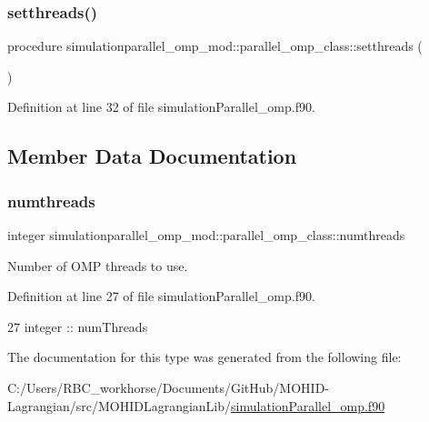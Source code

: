 \subsubsection{\texorpdfstring{setthreads()}{setthreads()}}
{\footnotesize\ttfamily procedure simulationparallel\+\_\+omp\+\_\+mod\+::parallel\+\_\+omp\+\_\+class\+::setthreads (\begin{DoxyParamCaption}{ }\end{DoxyParamCaption})\hspace{0.3cm}{\ttfamily [private]}}



Definition at line 32 of file simulation\+Parallel\+\_\+omp.\+f90.



\subsection{Member Data Documentation}
\mbox{\label{structsimulationparallel__omp__mod_1_1parallel__omp__class_ae0b69bf0f8a4f8df97fccf569ba20ff9}} 
\subsubsection{\texorpdfstring{numthreads}{numthreads}}
{\footnotesize\ttfamily integer simulationparallel\+\_\+omp\+\_\+mod\+::parallel\+\_\+omp\+\_\+class\+::numthreads\hspace{0.3cm}{\ttfamily [private]}}



Number of O\+MP threads to use. 



Definition at line 27 of file simulation\+Parallel\+\_\+omp.\+f90.


\begin{DoxyCode}
27         \textcolor{keywordtype}{integer} :: numThreads
\end{DoxyCode}


The documentation for this type was generated from the following file\+:\begin{DoxyCompactItemize}
\item 
C\+:/\+Users/\+R\+B\+C\+\_\+workhorse/\+Documents/\+Git\+Hub/\+M\+O\+H\+I\+D-\/\+Lagrangian/src/\+M\+O\+H\+I\+D\+Lagrangian\+Lib/\mbox{\hyperlink{simulation_parallel__omp_8f90}{simulation\+Parallel\+\_\+omp.\+f90}}\end{DoxyCompactItemize}
